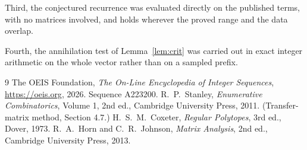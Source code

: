 \documentclass[11pt,a4paper]{article}
\theoremstyle{plain}
\theoremstyle{definition}
\begin{document}
Third, the conjectured recurrence was evaluated directly on the published terms, with no
matrices involved, and holds wherever the proved range and the data overlap.

Fourth, the annihilation test of Lemma~\ref{lem:crit} was carried out in exact integer
arithmetic on the whole vector rather than on a sampled prefix.

\begin{thebibliography}{9}
 The OEIS Foundation, \emph{The On-Line Encyclopedia of Integer
Sequences}, \url{https://oeis.org}, 2026. Sequence A223200.
 R.~P.~Stanley, \emph{Enumerative Combinatorics}, Volume 1, 2nd ed.,
Cambridge University Press, 2011. (Transfer-matrix method, Section 4.7.)
 H.~S.~M.~Coxeter, \emph{Regular Polytopes}, 3rd ed., Dover, 1973.
 R.~A.~Horn and C.~R.~Johnson, \emph{Matrix Analysis}, 2nd ed., Cambridge
University Press, 2013.
\end{thebibliography}
\end{document}
